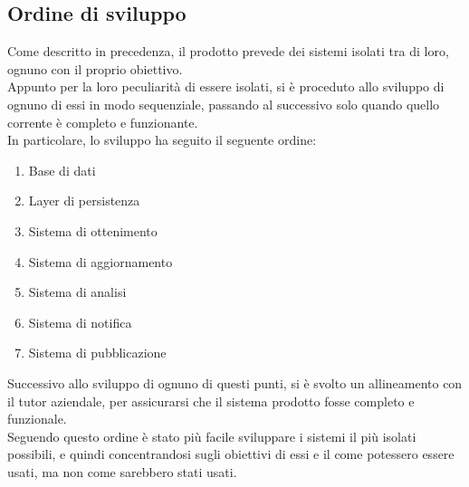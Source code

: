 	\subsection{Ordine di sviluppo}
		Come descritto in precedenza, il prodotto prevede dei sistemi isolati tra di loro, ognuno con il proprio obiettivo. \\
		Appunto per la loro peculiarità di essere isolati, si è proceduto allo sviluppo di ognuno di essi in modo sequenziale, passando al successivo solo quando quello corrente è completo e funzionante. \\
		In particolare, lo sviluppo ha seguito il seguente ordine:
		\begin{enumerate}
			\item Base di dati
			\item Layer di persistenza
			\item Sistema di ottenimento
			\item Sistema di aggiornamento
			\item Sistema di analisi
			\item Sistema di notifica
			\item Sistema di pubblicazione
		\end{enumerate}
		Successivo allo sviluppo di ognuno di questi punti, si è svolto un allineamento con il tutor aziendale, per assicurarsi che il sistema prodotto fosse completo e funzionale.\\
		Seguendo questo ordine è stato più facile sviluppare i sistemi il più isolati possibili, e quindi concentrandosi sugli obiettivi di essi e il come potessero essere usati, ma non come sarebbero stati usati. \\
